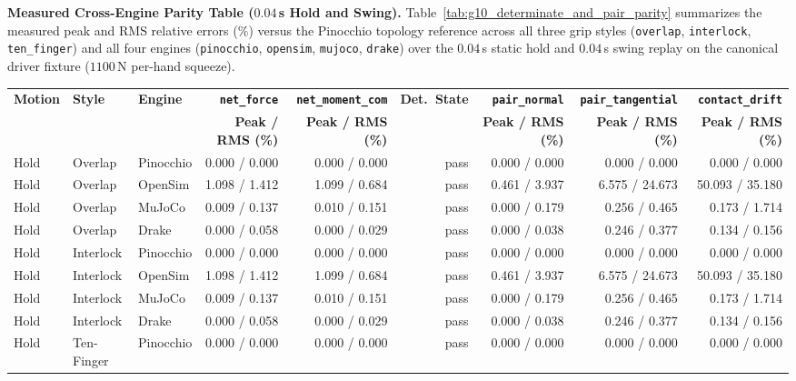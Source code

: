 \documentclass[11pt,a4paper]{article}
\begin{document}
\textbf{Measured Cross-Engine Parity Table ($0.04$\,s Hold and Swing).} Table~\ref{tab:g10_determinate_and_pair_parity} summarizes the measured peak and RMS relative errors ($\%$) versus the Pinocchio topology reference across all three grip styles (\texttt{overlap}, \texttt{interlock}, \texttt{ten\_finger}) and all four engines (\texttt{pinocchio}, \texttt{opensim}, \texttt{mujoco}, \texttt{drake}) over the $0.04$\,s static hold and $0.04$\,s swing replay on the canonical driver fixture ($1100$\,N per-hand squeeze).

\begin{table}[htbp]
\centering
\scriptsize
\begin{tabular}{lllrrrrrr}
\toprule
\textbf{Motion} & \textbf{Style} & \textbf{Engine} & \textbf{\texttt{net\_force}} & \textbf{\texttt{net\_moment\_com}} & \textbf{Det.\ State} & \textbf{\texttt{pair\_normal}} & \textbf{\texttt{pair\_tangential}} & \textbf{\texttt{contact\_drift}} \\
 &  &  & \textbf{Peak / RMS (\%)} & \textbf{Peak / RMS (\%)} &  & \textbf{Peak / RMS (\%)} & \textbf{Peak / RMS (\%)} & \textbf{Peak / RMS (\%)} \\
\midrule
Hold & Overlap & Pinocchio & 0.000 / 0.000 & 0.000 / 0.000 & pass & 0.000 / 0.000 & 0.000 / 0.000 & 0.000 / 0.000 \\
Hold & Overlap & OpenSim & 1.098 / 1.412 & 1.099 / 0.684 & pass & 0.461 / 3.937 & 6.575 / 24.673 & 50.093 / 35.180 \\
Hold & Overlap & MuJoCo & 0.009 / 0.137 & 0.010 / 0.151 & pass & 0.000 / 0.179 & 0.256 / 0.465 & 0.173 / 1.714 \\
Hold & Overlap & Drake & 0.000 / 0.058 & 0.000 / 0.029 & pass & 0.000 / 0.038 & 0.246 / 0.377 & 0.134 / 0.156 \\
\midrule
Hold & Interlock & Pinocchio & 0.000 / 0.000 & 0.000 / 0.000 & pass & 0.000 / 0.000 & 0.000 / 0.000 & 0.000 / 0.000 \\
Hold & Interlock & OpenSim & 1.098 / 1.412 & 1.099 / 0.684 & pass & 0.461 / 3.937 & 6.575 / 24.673 & 50.093 / 35.180 \\
Hold & Interlock & MuJoCo & 0.009 / 0.137 & 0.010 / 0.151 & pass & 0.000 / 0.179 & 0.256 / 0.465 & 0.173 / 1.714 \\
Hold & Interlock & Drake & 0.000 / 0.058 & 0.000 / 0.029 & pass & 0.000 / 0.038 & 0.246 / 0.377 & 0.134 / 0.156 \\
\midrule
Hold & Ten-Finger & Pinocchio & 0.000 / 0.000 & 0.000 / 0.000 & pass & 0.000 / 0.000 & 0.000 / 0.000 & 0.000 / 0.000 \\

\end{tabular}
\end{table}
\end{document}
